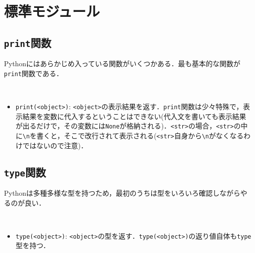 \section{標準モジュール}

\subsection{\texttt{print}関数}

Pythonにはあらかじめ入っている関数がいくつかある．最も基本的な関数が\texttt{print}関数である．

\begin{gram}　
\begin{itemize}
\item \texttt{print(<object>)}: \texttt{<object>}の表示結果を返す．\texttt{print}関数は少々特殊で，表示結果を変数に代入するということはできない(代入文を書いても表示結果が出るだけで，その変数には\texttt{None}が格納される)．\texttt{<str>}の場合，\texttt{<str>}の中に\verb|\n|を書くと，そこで改行されて表示される(\texttt{<str>}自身から\verb|\n|がなくなるわけではないので注意)．
\end{itemize}
\end{gram}

\begin{cod}[\texttt{py1.py}]　
}]{code/py1.py}
\vspace{-7pt}
\begin{lstlisting}
~~~Hello world!~~~
---Hello
world!---
\end{lstlisting}
\end{cod}
\vspace{-10pt}

\begin{cod}[\texttt{py2.py}]　
}]{code/py2.py}
\vspace{-7pt}
\begin{lstlisting}
---
10
---
None
\end{lstlisting}
\end{cod}
\vspace{-10pt}

\subsection{\texttt{type}関数}

Pythonは多種多様な型を持つため，最初のうちは型をいろいろ確認しながらやるのが良い．

\begin{gram}　
\begin{itemize}
\item \texttt{type(<object>)}: \texttt{<object>}の型を返す．\texttt{type(<object>)}の返り値自体も\texttt{type}型を持つ．
\end{itemize}
\end{gram}

